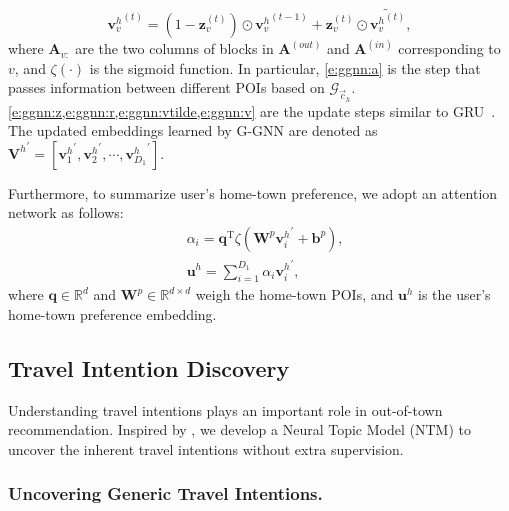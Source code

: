 \documentclass[letterpaper]{article} %
\begin{document}
%
\begin{equation} \label{e:ggnn:v}
  {\mathbf{v}_v^h}^{(t)} = (1 - \mathbf{z}_v^{(t)}) \odot {\mathbf{v}_v^h}^{(t-1)} 
  										 + \mathbf{z}_v^{(t)}   \odot
  						  \widetilde{{\mathbf{v}_v^h}^{(t)}} ,
\end{equation}
%
where $\mathbf{A}_{v:}$ are the two columns of blocks in $\mathbf{A}^{(out)}$ and $\mathbf{A}^{(in)}$ corresponding to $v$, and $\zeta(\cdot)$ is the sigmoid function.
In particular, \cref{e:ggnn:a} is the step that passes information between different POIs based on $\mathcal{G}_{\vec{c}_h}$. 
\cref{e:ggnn:z,e:ggnn:r,e:ggnn:vtilde,e:ggnn:v} are the update steps similar to GRU~\cite{cho2014properties}.
The updated embeddings learned by G-GNN are denoted as 
${\mathbf{V}^h}^{\prime} = \left[ {\mathbf{v}^h_1}^{\prime}, {\mathbf{v}^h_2}^{\prime}, \cdots, {\mathbf{v}^h_{D_1}}^{\prime} \right] $.

Furthermore, to summarize user's home-town preference, we adopt an attention network as follows:
%
\begin{equation} \label{e:home_preference}
    \begin{split}
        &\alpha_i = \mathbf{q}^{\mathrm{T}}
        \zeta\left(\mathbf{W}^p {\mathbf{v}^h_i}^{\prime} + \bm{b}^p \right)  ,
        \\
        &\mathbf{u}^h = \sum_{i=1}^{D_1}
        \alpha_i {\mathbf{v}^h_i}^{\prime}  ,
    \end{split}
\end{equation}
%
where $\mathbf{q} \in \mathbb{R}^d$ and $\mathbf{W}^p \in \mathbb{R}^{d \times d}$ weigh the home-town POIs, 
and $\mathbf{u}^h$ is the user's home-town preference embedding.


\subsection{Travel Intention Discovery}
Understanding travel intentions plays an important role in out-of-town recommendation.
Inspired by \cite{miao2017discovering,srivastava2017autoencoding}, we develop a Neural Topic Model (NTM) to uncover the inherent travel intentions without extra supervision. 

\subsubsection{Uncovering Generic Travel Intentions.}
\end{document}
